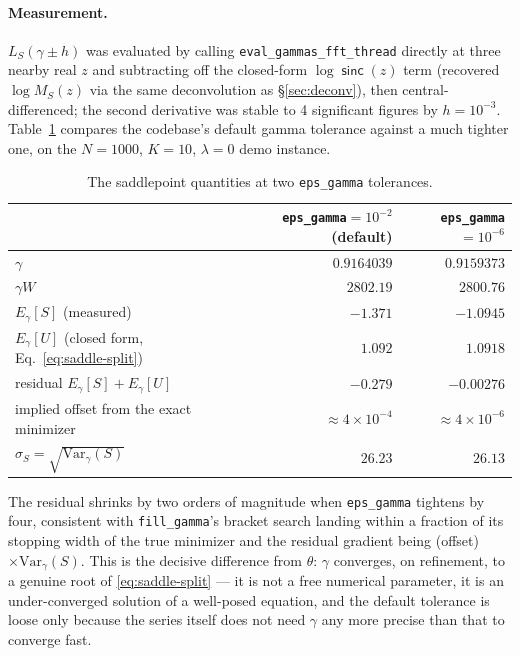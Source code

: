 \documentclass[11pt]{article}
\newcommand{\sinck}{\operatorname{\mathsf{sinc}}}
\begin{document}
\paragraph{Measurement.} $L_S(\gamma\pm h)$ was evaluated by calling \texttt{eval\_gammas\_fft\_thread}
directly at three nearby real $z$ and subtracting off the closed-form $\log\sinck(z)$ term (recovered
$\log M_S(z)$ via the same deconvolution as \S\ref{sec:deconv}), then central-differenced; the second
derivative was stable to 4 significant figures by $h=10^{-3}$. Table~\ref{tab:saddle} compares the
codebase's default gamma tolerance against a much tighter one, on the $N{=}1000$, $K{=}10$, $\lambda=0$
demo instance.

\begin{table}[h]
\centering
\caption{The saddlepoint quantities at two \texttt{eps\_gamma} tolerances.}
\label{tab:saddle}
\begin{tabular}{@{}lrr@{}}
\toprule
 & \texttt{eps\_gamma}$=10^{-2}$ (default) & \texttt{eps\_gamma}$=10^{-6}$ \\
\midrule
$\gamma$ & $0.9164039$ & $0.9159373$ \\
$\gamma W$ & $2802.19$ & $2800.76$ \\
$E_\gamma[S]$ (measured) & $-1.371$ & $-1.0945$ \\
$E_\gamma[U]$ (closed form, Eq.~\ref{eq:saddle-split}) & $1.092$ & $1.0918$ \\
residual $E_\gamma[S]+E_\gamma[U]$ & $-0.279$ & $-0.00276$ \\
implied offset from the exact minimizer & $\approx4\times10^{-4}$ & $\approx4\times10^{-6}$ \\
$\sigma_S=\sqrt{\mathrm{Var}_\gamma(S)}$ & $26.23$ & $26.13$ \\
\bottomrule
\end{tabular}
\end{table}

The residual shrinks by two orders of magnitude when \texttt{eps\_gamma} tightens by four, consistent
with \texttt{fill\_gamma}'s bracket search landing within a fraction of its stopping width of the true
minimizer and the residual gradient being (offset)$\times\mathrm{Var}_\gamma(S)$. This is the
decisive difference from $\theta$: $\gamma$ converges, on refinement, to a genuine root of
\eqref{eq:saddle-split} — it is not a free numerical parameter, it is an under-converged solution of a
well-posed equation, and the default tolerance is loose only because the series itself does not need
$\gamma$ any more precise than that to converge fast.
\end{document}
